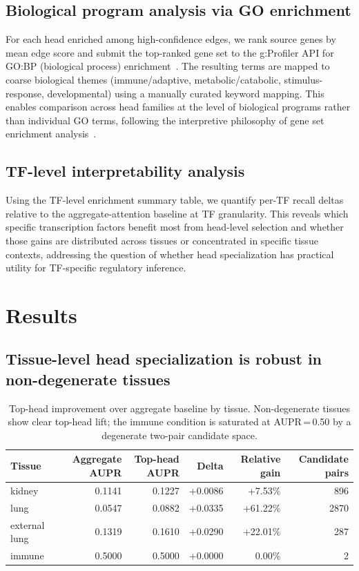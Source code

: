 \documentclass[11pt]{article}
\begin{document}
\subsection{Biological program analysis via GO enrichment}
For each head enriched among high-confidence edges, we rank source genes by mean edge score and submit the top-ranked gene set to the g:Profiler API for GO:BP (biological process) enrichment~\cite{kolberg2020gprofiler2}. The resulting terms are mapped to coarse biological themes (immune/adaptive, metabolic/catabolic, stimulus-response, developmental) using a manually curated keyword mapping. This enables comparison across head families at the level of biological programs rather than individual GO terms, following the interpretive philosophy of gene set enrichment analysis~\cite{subramanian2005gsea}.

\subsection{TF-level interpretability analysis}
Using the TF-level enrichment summary table, we quantify per-TF recall deltas relative to the aggregate-attention baseline at TF granularity. This reveals which specific transcription factors benefit most from head-level selection and whether those gains are distributed across tissues or concentrated in specific tissue contexts, addressing the question of whether head specialization has practical utility for TF-specific regulatory inference.


\section{Results}

\subsection{Tissue-level head specialization is robust in non-degenerate tissues}

\begin{table}[htbp]
\centering
\small
\caption{Top-head improvement over aggregate baseline by tissue. Non-degenerate tissues show clear top-head lift; the immune condition is saturated at AUPR\,=\,0.50 by a degenerate two-pair candidate space.}
\label{tab:top-head-gain}
\begin{tabular}{lrrrrr}
\toprule
Tissue & Aggregate AUPR & Top-head AUPR & Delta & Relative gain & Candidate pairs \\
\midrule
kidney & 0.1141 & 0.1227 & +0.0086 & +7.53\% & 896 \\
lung & 0.0547 & 0.0882 & +0.0335 & +61.22\% & 2870 \\
external lung & 0.1319 & 0.1610 & +0.0290 & +22.01\% & 287 \\
immune & 0.5000 & 0.5000 & +0.0000 & 0.00\% & 2 \\
\bottomrule
\end{tabular}
\end{table}
\end{document}
